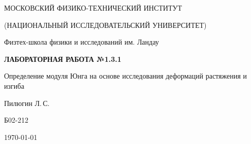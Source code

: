 
\begin{center}
    {
        \MakeUppercase{Московский физико-технический институт}

        \MakeUppercase{(Национальный исследовательский университет)}
    }

    {
        Физтех-школа физики и исследований им. Ландау
    }
    
    \vspace{200pt}
    {
        \Huge
        \bfseries
        \MakeUppercase{Лабораторная работа №1.3.1}
    }

    \vspace{24pt}
    {
        \Large
        Определение модуля Юнга на основе исследования деформаций растяжения и изгиба
    }

    \vspace{24pt}
    {
        \large
        Пилюгин Л.\,С.

        Б02-212
    }

    \vspace{2pt}
    {
        \large
        \today
    }
\end{center}

\newpage
{}
\setcounter{page}{2}
